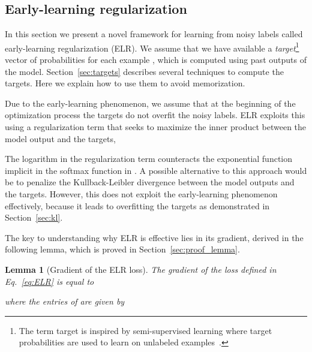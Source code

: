 \documentclass{article}
\newtheorem{lemma}[theorem]{Lemma}
\newcommand{\1}{\mathds{1}}
\begin{document}
\subsection{Early-learning regularization}
\label{sec:ELR}
In this section we present a novel framework for learning from noisy labels called early-learning regularization (ELR). We assume that we have available a \emph{target}\footnote{The term target is inspired by semi-supervised learning where target probabilities are used to learn on unlabeled examples~\citep{yarowsky1995unsupervised, mcclosky2006effective, laine2016temporal}.} vector of probabilities  for each example , which is computed using past outputs of the model. Section~\ref{sec:targets} describes several techniques to compute the targets. Here we explain how to use them to avoid memorization. 

Due to the early-learning phenomenon, we assume that at the beginning of the optimization process the targets do not overfit the noisy labels. ELR exploits this using a regularization term that seeks to maximize the inner product between the model output and the targets,

The logarithm in the regularization term counteracts the exponential function implicit in the softmax function in . A possible alternative to this approach would be to penalize the Kullback-Leibler divergence between the model outputs and the targets. However, this does not exploit the early-learning phenomenon effectively, because it leads to overfitting the targets as demonstrated in Section~\ref{sec:kl}. 

The key to understanding why ELR is effective lies in its gradient, derived in the following lemma, which is proved in Section~\ref{sec:proof_lemma}.

\begin{lemma}[Gradient of the ELR loss]
\label{lemma:ELR_gradient}
The gradient of the loss defined in Eq.~\eqref{eq:ELR} is equal to

where the entries of  are given by

\end{lemma}
\end{document}
